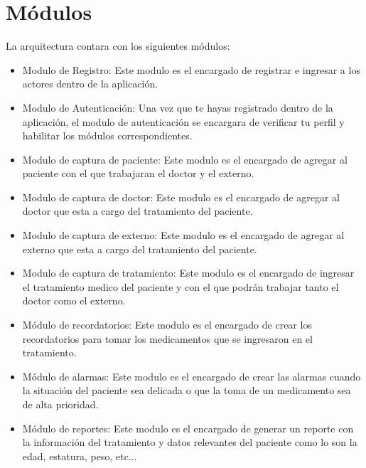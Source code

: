 \section{Módulos}
La arquitectura contara con los siguientes módulos:
\begin{itemize}
	\item Modulo de Registro: Este modulo es el encargado de registrar e ingresar a los actores dentro de la aplicación. 
	
	
	\item Modulo de Autenticación: Una vez que te hayas registrado dentro de la aplicación, el modulo de autenticación se encargara de verificar tu perfil y habilitar los módulos correspondientes.
	
	 
	\item Modulo de captura de paciente: Este modulo es el encargado de agregar al paciente con el que trabajaran el doctor y el externo.
	
	\item Modulo de captura de doctor: Este modulo es el encargado de agregar al doctor que esta a cargo del tratamiento del paciente.
	
	\item Modulo de captura de externo: Este modulo es el encargado de agregar al externo que esta a cargo del tratamiento del paciente.
	
	\item Modulo de captura de tratamiento: Este modulo es el encargado de ingresar el tratamiento medico del paciente y con el que podrán trabajar tanto el doctor como el externo. 
	
	\item Módulo de recordatorios: Este modulo es el encargado de crear los recordatorios para tomar los medicamentos que se ingresaron en el tratamiento.
	
	\item Módulo de alarmas: Este modulo es el encargado de crear las alarmas cuando la situación del paciente sea delicada o que la toma de un medicamento sea de alta prioridad.
	
	\item Módulo de reportes: Este modulo es el encargado de generar un reporte con la información del tratamiento y datos relevantes del paciente como lo son la edad, estatura, peso, etc...
	
	
	
	
	

\end{itemize}

